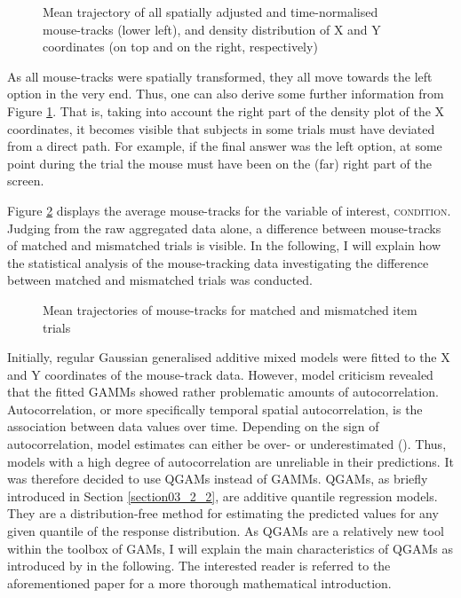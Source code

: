 \begin{figure}
    \centering
    
    \caption{Mean trajectory of all spatially adjusted and time-normalised mouse-tracks (lower left), and density distribution of X and Y coordinates (on top and on the right, respectively)}
    \label{fig:7_7}
\end{figure}

As all mouse-tracks were spatially transformed, they all move towards the left option in the very end. Thus, one can also derive some further information from Figure \ref{fig:7_7}. That is, taking into account the right part of the density plot of the X coordinates, it becomes visible that subjects in some trials must have deviated from a direct path. For example, if the final answer was the left option, at some point during the trial the mouse must have been on the (far) right part of the screen.

Figure \ref{fig:7_8} displays the average mouse-tracks for the variable of interest, \textsc{condition}. Judging from the raw aggregated data alone, a difference between mouse-tracks of matched and mismatched trials is visible. In the following, I will explain how the statistical analysis of the mouse-tracking data investigating the difference between matched and mismatched trials was conducted.

\begin{figure}
    \centering
    
    \caption{Mean trajectories of mouse-tracks for matched and mismatched item trials}
    \label{fig:7_8}
\end{figure}

Initially, regular Gaussian generalised additive mixed models were fitted to the X and Y coordinates of the mouse-track data. However, model criticism revealed that the fitted GAMMs showed rather problematic amounts of autocorrelation. Autocorrelation, or more specifically temporal spatial autocorrelation, is the association between data values over time. Depending on the sign of autocorrelation, model estimates can either be over- or underestimated (\cite{Charlton2009}). Thus, models with a high degree of autocorrelation are unreliable in their predictions. It was therefore decided to use QGAMs instead of GAMMs. QGAMs, as briefly introduced in Section \ref{section03_2_2}, are additive quantile regression models. They are a distribution-free method for estimating the predicted values for any given quantile of the response distribution. As QGAMs are a relatively new tool within the toolbox of GAMs, I will explain the main characteristics of QGAMs as introduced by \citet{Fasiolo2021} in the following. The interested reader is referred to the aforementioned paper for a more thorough mathematical introduction. 

